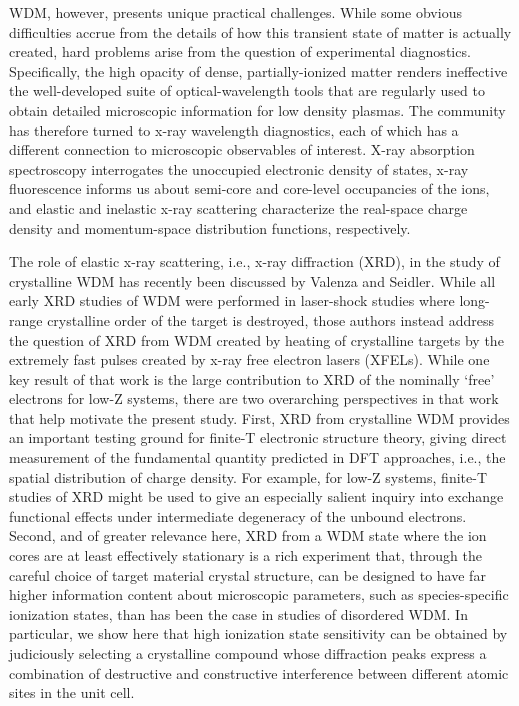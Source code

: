WDM, however, presents unique practical challenges. While some obvious
difficulties accrue from the details of how this transient state of
matter is actually created, hard problems arise from the question of
experimental diagnostics. Specifically, the high opacity of dense,
partially-ionized matter renders ineffective the well-developed suite of
optical-wavelength tools that are regularly used to obtain detailed
microscopic information for low density plasmas. The community has
therefore turned to x-ray wavelength diagnostics, each of which has a
different connection to microscopic observables of interest. X-ray
absorption spectroscopy interrogates the unoccupied electronic density
of states, x-ray fluorescence informs us about semi-core and core-level
occupancies of the ions, and elastic and inelastic x-ray scattering
characterize the real-space charge density and momentum-space
distribution functions, respectively. \cite{CHASE2016ULTRAFAST, YANO2009X}

The role of elastic x-ray scattering, i.e., x-ray diffraction (XRD), in
the study of crystalline WDM has recently been discussed by Valenza and
Seidler. \cite{VALENZA2016WARM} While all early XRD studies of WDM were performed in
laser-shock studies where long-range crystalline order of the target is
destroyed, those authors instead address the question of XRD from WDM
created by heating of crystalline targets by the extremely fast pulses
created by x-ray free electron lasers (XFELs). \cite{MA2013X} While one key
result of that work is the large contribution to XRD of the nominally
`free' electrons for low-Z systems, there are two overarching
perspectives in that work that help motivate the present study. First,
XRD from crystalline WDM provides an important testing ground for
finite-T electronic structure theory, giving direct measurement of the
fundamental quantity predicted in DFT approaches, i.e., the spatial
distribution of charge density. For example, for low-Z systems, finite-T
studies of XRD might be used to give an especially salient inquiry into
exchange functional effects under intermediate degeneracy of the unbound
electrons. Second, and of greater relevance here, XRD from a WDM state
where the ion cores are at least effectively stationary is a rich
experiment that, through the careful choice of target material crystal
structure, can be designed to have far higher information content about
microscopic parameters, such as species-specific ionization states, than
has been the case in studies of disordered WDM. In particular, we show
here that high ionization state sensitivity can be obtained by
judiciously selecting a crystalline compound whose diffraction peaks
express a combination of destructive and constructive interference
between different atomic sites in the unit cell.

